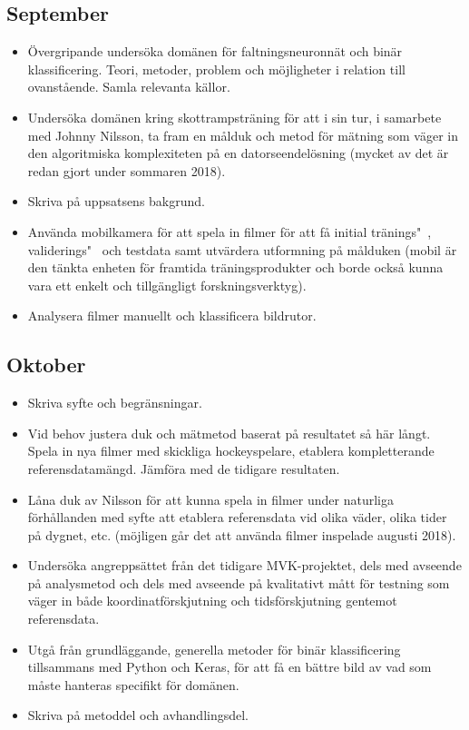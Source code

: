 \documentclass[a4paper,12pt]{article}
\begin{document}
\subsection*{September}
\begin{itemize}
  \item Övergripande undersöka domänen för faltningsneuronnät och binär
    klassificering. Teori, metoder, problem och möjligheter i relation till
    ovanstående. Samla relevanta källor.
  \item Undersöka domänen kring skottrampsträning för att i sin tur, i
    samarbete med Johnny Nilsson, ta fram en målduk och metod för mätning
    som väger in den algoritmiska komplexiteten på en datorseendelösning
    (mycket av det är redan gjort under sommaren 2018).
  \item Skriva på uppsatsens bakgrund.
  \item Använda mobilkamera för att spela in filmer för att få initial
    tränings"~, validerings"~ och testdata samt utvärdera utformning på
    målduken (mobil är den tänkta enheten för framtida träningsprodukter
    och borde också kunna vara ett enkelt och tillgängligt forskningsverktyg).
  \item Analysera filmer manuellt och klassificera bildrutor.
\end{itemize}

\subsection*{Oktober}
\begin{itemize}
  \item Skriva syfte och begränsningar.
  \item Vid behov justera duk och mätmetod baserat på resultatet så här långt.
    Spela in nya filmer med skickliga hockeyspelare, etablera kompletterande
    referensdatamängd. Jämföra med de tidigare resultaten.
  \item Låna duk av Nilsson för att kunna spela in filmer under naturliga
    förhållanden med syfte att etablera referensdata vid olika väder, olika
    tider på dygnet, etc. (möjligen går det att använda filmer inspelade
    augusti 2018).
  \item Undersöka angreppsättet från det tidigare MVK-projektet, dels med
    avseende på analysmetod och dels med avseende på kvalitativt mått för
    testning som väger in både koordinatförskjutning och tidsförskjutning
    gentemot referensdata.
  \item Utgå från grundläggande, generella metoder för binär klassificering
    tillsammans med Python och Keras, för att få en bättre bild av vad som
    måste hanteras specifikt för domänen.
  \item Skriva på metoddel och avhandlingsdel.
\end{itemize}
\end{document}
